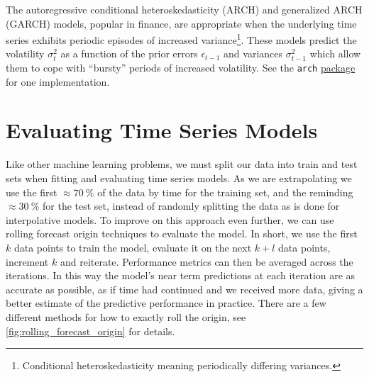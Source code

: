The autoregressive conditional heteroskedasticity (ARCH) and generalized ARCH (GARCH) models,
popular in finance, are appropriate when the underlying time series
exhibits periodic episodes of increased variance\footnote{Conditional heteroskedasticity meaning periodically differing variances.}.
These models predict the volatility $\sigma_{t}^{2}$ as a function of
the prior errors $\epsilon_{t-1}$ and variances $\sigma_{t-1}^{2}$
which allow them to cope with ``bursty'' periods of increased volatility.
See the \texttt{arch}
\href{https://arch.readthedocs.io/en/stable/univariate/introduction.html}{package}
for one implementation.

\section{Evaluating Time Series Models}
\label{time_series:eval}

Like other machine learning problems, we must split our data into train and test sets
when fitting and evaluating time series models.
As we are extrapolating we use the first
$\approx \SI{70}{\percent}$ of the data by time for the training set,
and the reminding $\approx \SI{30}{\percent}$ for the test set,
instead of randomly splitting the data as is done for interpolative models.
To improve on this approach even further, we can use
rolling forecast origin techniques to evaluate the model.
In short, we use the first $k$ data points to train the model,
evaluate it on the next $k + l$ data points, increment $k$ and reiterate.
Performance metrics can then be averaged across the iterations.
In this way the model's near term predictions at each iteration are as accurate as possible,
as if time had continued and we received more data,
giving a better estimate of the predictive performance in practice.
There are a few different methods for how to exactly roll the origin,
see \cref{fig:rolling_forecast_origin} for details.

